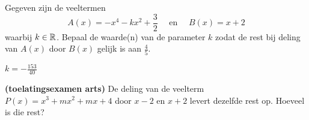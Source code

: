 \documentclass{ximera}
\begin{document}
	\author{Koen De Naeghel - Wiskunde Op Maat}
    \xmsource
	\label{xim:veeltermen_deling_door_xa_oefeningen_reeks2}


\begin{exercise}
Gegeven zijn de veeltermen
\[
A(x) = -x^4 - kx^2+\frac{3}{2} \quad \text{ en } \quad B(x) = x+2
\]
waarbij \(k \in \mathbb{R}\). Bepaal de waarde(n) van de parameter \(k\) zodat de rest bij deling van \(A(x)\) door \(B(x)\) gelijk is aan \(\frac{4}{5}\). 
\begin{uitkomst} \( k = - \frac{153}{40} \) \end{uitkomst} 
\end{exercise}

\begin{exercise}
{\bf (toelatingsexamen arts)} 
De deling van de veelterm \(P(x) = x^3 + mx^2 + mx + 4\) door \(x-2\) en \(x+2\) levert dezelfde rest op. Hoeveel is die rest?
\begin{multipleChoice}
\end{multipleChoice}
\end{exercise}
\end{document}

